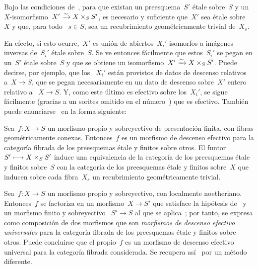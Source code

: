 \begin{corollaire}
\label{IX.6.7}
Bajo las condiciones de~, para que existan un preesquema~$S'$
étale sobre~$S$ y un~$X$-isomorfismo~$X'\xrightarrow{\sim} X\times_S S'$, es
necesario y suficiente que~$X'$ sea étale sobre~$X$ y que, para todo
~$s\in S$,
sea un recubrimiento geométricamente trivial de~$X_s$.
\end{corollaire}

En efecto, si esto ocurre,~$X'$ es unión de abiertos~$X_i'$ isomorfos a
imágenes inversas de~$S_i'$ étale sobre~$S$. Se ve entonces fácilmente que
estos~$S_i'$ se pegan en un~$S'$ étale sobre~$S$ y que se obtiene un
isomorfismo~$X'\xrightarrow{\sim} X\times_S S'$. Puede decirse, por ejemplo, que los
~$X_i'$ están provistos de datos de descenso relativos a~$X\to S$, que se
pegan necesariamente en un dato de descenso sobre~$X'$ entero relativo a
~$X\to S$. Y, como este último es efectivo sobre los~$X_i'$, se sigue
fácilmente (gracias a un sorites omitido en el número~) que es
efectivo. También puede enunciarse~ en la forma siguiente:

\begin{corollaire}
\label{IX.6.8}
Sea~$f\colon X\to S$ un morfismo propio y sobreyectivo de presentación
finita, con fibras geométricamente conexas. Entonces~$f$ es un morfismo de
descenso efectivo para la categoría fibrada de los preesquemas étale y
finitos sobre otros. El funtor~$S'\longmapsto X\times_S S'$ induce una equivalencia
de la categoría de los preesquemas étale y finitos sobre~$S$ con la
categoría de los preesquemas
étale y finitos sobre~$X$ que inducen sobre cada fibra~$X_s$ un
recubrimiento geométricamente trivial.
\end{corollaire}

\begin{remarque}
\label{IX.6.9}
Sea~$f\colon X\to S$ un morfismo propio y sobreyectivo, con
localmente noetheriano. Entonces~$f$ se factoriza en un morfismo~$X\to S'$
que satisface la hipótesis de~ y un morfismo finito y sobreyectivo
~$S'\to S$ al que se aplica~; por tanto, se expresa como
composición de dos
morfismos que son \emph{morfismos de descenso efectivo universales} para la
categoría fibrada de los preesquemas étale y finitos sobre otros. Puede
concluirse que el propio~$f$ es un morfismo de descenso efectivo universal
para la categoría fibrada considerada. Se recupera así~ por un
método diferente.
\end{remarque}


